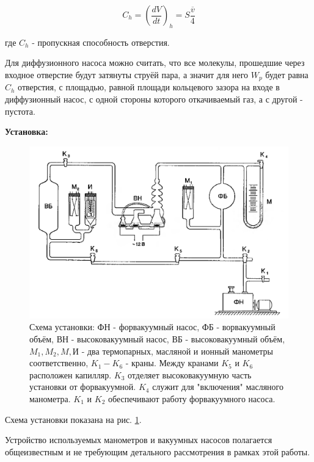 \documentclass[a4paper,12pt]{article}
\begin{document}
\begin{equation}\label{eq-hole-resist}
C_h = (\frac{dV}{dt})_h = S\frac{\overline{v}}{4} 
\end{equation}

где $C_h$ - пропускная способность отверстия.

Для диффузионного насоса можно считать, что все молекулы, прошедшие через входное отверстие будут затянуты струёй пара, а значит для него $W_p$ будет равна $C_h$ отверстия, с площадью, равной площади кольцевого зазора на входе в диффузионный насос, с одной стороны которого откачиваемый газ, а с другой - пустота.

\bigskip

\textbf{Установка:}
\medskip

\begin{figure}[ht]
\centering
\includegraphics[width=170mm]{schema.png}
\caption{Схема установки: ФН - форвакуумный насос, ФБ - ворвакуумный объём, ВН - высоковакуумный насос, ВБ - высоковакуумный объём, $M_1, M_2, M, \text{И}$ - два термопарных, масляной и ионный манометры соответственно, $K_1 - K_6$ - краны. Между кранами $K_5$ и $K_6$ расположен капилляр. $K_3$ отделяет высоковакуумную часть установки от форвакуумной. $K_4$ служит для "включения"  масляного манометра. $K_1$ и $K_2$ обеспечивают работу форвакуумного насоса.}\label{schema}
\end{figure}

Схема установки показана на рис. \ref{schema}.

Устройство используемых манометров и вакуумных насосов полагается общеизвестным и не требующим детального рассмотрения в рамках этой работы.

\bigskip
\end{document}
